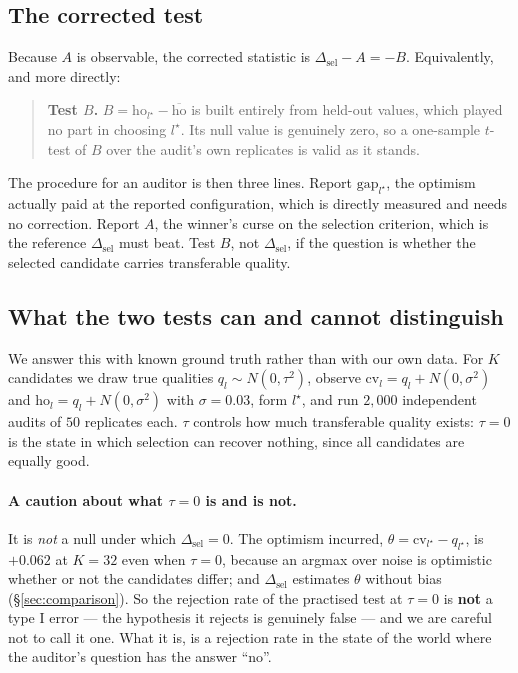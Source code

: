 \documentclass{article}
\begin{document}
\subsection{The corrected test}

Because $A$ is observable, the corrected statistic is
$\Delta_{\text{sel}}-A=-B$. Equivalently, and more directly:

\begin{quote}
\textbf{Test $B$.} $B=\text{ho}_{l^\star}-\overline{\text{ho}}$ is built
entirely from held-out values, which played no part in choosing $l^\star$.
Its null value is genuinely zero, so a one-sample $t$-test of $B$ over the
audit's own replicates is valid as it stands.
\end{quote}

The procedure for an auditor is then three lines. Report
$\text{gap}_{l^\star}$, the optimism actually paid at the reported
configuration, which is directly measured and needs no correction. Report $A$,
the winner's curse on the selection criterion, which is the reference
$\Delta_{\text{sel}}$ must beat. Test $B$, not $\Delta_{\text{sel}}$, if the
question is whether the selected candidate carries transferable quality.

\subsection{What the two tests can and cannot distinguish}
\label{sec:sizepower}

We answer this with known ground truth rather than with our own data. For $K$
candidates we draw true qualities $q_l\sim N(0,\tau^2)$, observe
$\text{cv}_l=q_l+N(0,\sigma^2)$ and $\text{ho}_l=q_l+N(0,\sigma^2)$ with
$\sigma=0.03$, form $l^\star$, and run $2{,}000$ independent audits of $50$
replicates each. $\tau$ controls how much transferable quality exists:
$\tau=0$ is the state in which selection can recover nothing, since all
candidates are equally good.

\paragraph{A caution about what $\tau=0$ is and is not.} It is \emph{not} a
null under which $\Delta_{\text{sel}}=0$. The optimism incurred,
$\theta=\text{cv}_{l^\star}-q_{l^\star}$, is $+0.062$ at $K=32$ even when
$\tau=0$, because an argmax over noise is optimistic whether or not the
candidates differ; and $\Delta_{\text{sel}}$ estimates $\theta$ without bias
(\S\ref{sec:comparison}). So the rejection rate of the practised test at
$\tau=0$ is \textbf{not} a type I error --- the hypothesis it rejects is
genuinely false --- and we are careful not to call it one. What it is, is a
rejection rate in the state of the world where the auditor's question has the
answer ``no''.
\end{document}
